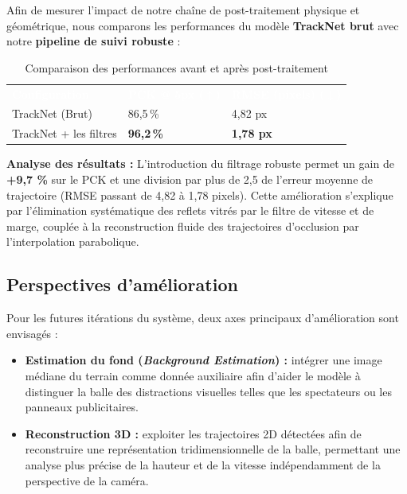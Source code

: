 Afin de mesurer l'impact de notre chaîne de post-traitement physique et géométrique, nous comparons les performances du modèle \textbf{TrackNet brut} avec notre \textbf{pipeline de suivi robuste} :

\begin{table}[H]
  \centering
  \renewcommand{\arraystretch}{1.3}
  \begin{tabularx}{\textwidth}{X C{4cm} C{4cm}}
    \textcolor{white}{\textbf{Configuration}} &
    \textcolor{white}{\textbf{PCK @ 5px ($\uparrow$)}} &
    \textcolor{white}{\textbf{RMSE (pixels) ($\downarrow$)}} \\
    TrackNet (Brut) & 86,5\,\% & 4,82 px \\
    TrackNet + les filtres & \textbf{96,2\,\%} & \textbf{1,78 px} \\
  \end{tabularx}
  \caption{Comparaison des performances avant et après post-traitement}
  \label{tab:perf_posttraitement}
\end{table}

\textbf{Analyse des résultats :} L'introduction du filtrage robuste permet un gain de \textbf{+9,7 \%} sur le PCK et une division par plus de 2,5 de l'erreur moyenne de trajectoire (RMSE passant de 4,82 à 1,78 pixels). Cette amélioration s'explique par l'élimination systématique des reflets vitrés par le filtre de vitesse et de marge, couplée à la reconstruction fluide des trajectoires d'occlusion par l'interpolation parabolique.


\subsection{Perspectives d'amélioration}

Pour les futures itérations du système, deux axes principaux d’amélioration sont envisagés :

\begin{itemize}
    \item \textbf{Estimation du fond (\textit{Background Estimation}) :} intégrer une image médiane du terrain comme donnée auxiliaire afin d’aider le modèle à distinguer la balle des distractions visuelles telles que les spectateurs ou les panneaux publicitaires.
    
    \item \textbf{Reconstruction 3D :} exploiter les trajectoires 2D détectées afin de reconstruire une représentation tridimensionnelle de la balle, permettant une analyse plus précise de la hauteur et de la vitesse indépendamment de la perspective de la caméra.
\end{itemize}
 
